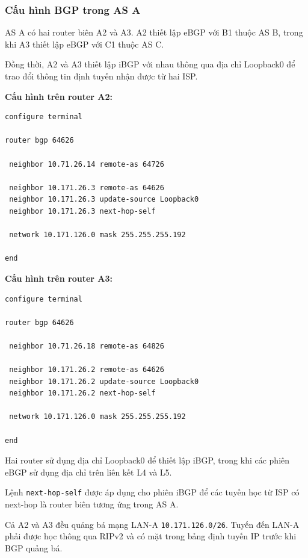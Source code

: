 
\subsubsection{Cấu hình BGP trong AS A}

AS A có hai router biên A2 và A3.
A2 thiết lập eBGP với B1 thuộc AS B,
trong khi A3 thiết lập eBGP với C1
thuộc AS C.

Đồng thời, A2 và A3 thiết lập
iBGP với nhau thông qua địa chỉ
Loopback0 để trao đổi thông tin
định tuyến nhận được từ hai ISP.

\textbf{Cấu hình trên router A2:}

\begin{lstlisting}
configure terminal

router bgp 64626

 neighbor 10.71.26.14 remote-as 64726

 neighbor 10.171.26.3 remote-as 64626
 neighbor 10.171.26.3 update-source Loopback0
 neighbor 10.171.26.3 next-hop-self

 network 10.171.126.0 mask 255.255.255.192

end
\end{lstlisting}

\textbf{Cấu hình trên router A3:}

\begin{lstlisting}
configure terminal

router bgp 64626

 neighbor 10.71.26.18 remote-as 64826

 neighbor 10.171.26.2 remote-as 64626
 neighbor 10.171.26.2 update-source Loopback0
 neighbor 10.171.26.2 next-hop-self

 network 10.171.126.0 mask 255.255.255.192

end
\end{lstlisting}

Hai router sử dụng địa chỉ
Loopback0 để thiết lập iBGP,
trong khi các phiên eBGP sử dụng
địa chỉ trên liên kết L4 và L5.

Lệnh \texttt{next-hop-self}
được áp dụng cho phiên iBGP
để các tuyến học từ ISP
có next-hop là router biên
tương ứng trong AS A.

Cả A2 và A3 đều quảng bá mạng
LAN-A \texttt{10.171.126.0/26}.
Tuyến đến LAN-A phải được học
thông qua RIPv2 và có mặt
trong bảng định tuyến IP
trước khi BGP quảng bá.


